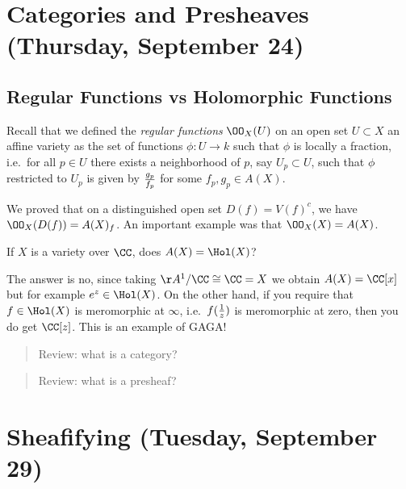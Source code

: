 \hypertarget{categories-and-presheaves-thursday-september-24}{%
\section{Categories and Presheaves (Thursday, September
24)}\label{categories-and-presheaves-thursday-september-24}}

\hypertarget{regular-functions-vs-holomorphic-functions}{%
\subsection{Regular Functions vs Holomorphic
Functions}\label{regular-functions-vs-holomorphic-functions}}

Recall that we defined the \emph{regular functions} \(\OO_X(U)\) on an
open set \(U\subset X\) an affine variety as the set of functions
\(\phi: U\to k\) such that \(\phi\) is locally a fraction, i.e.~for all
\(p\in U\) there exists a neighborhood of \(p\), say \(U_p \subset U\),
such that \(\phi\) restricted to \(U_p\) is given by \(g_p \over f_p\)
for some \(f_p, g_p \in A(X)\).

We proved that on a distinguished open set \(D(f) = V(f)^c\), we have
\(\OO_X(D(f)) = A(X)_f\). An important example was that
\(\OO_X(X) = A(X)\).

\begin{question}

If \(X\) is a variety over \(\CC\), does \(A(X) = \Hol(X)\)?

\end{question}

\begin{answer}

The answer is no, since taking \(\AA^1/\CC \cong \CC = X\) we obtain
\(A(X) = \CC[x]\) but for example \(e^z \in \Hol(X)\). On the other
hand, if you require that \(f\in \Hol(X)\) is meromorphic at \(\infty\),
i.e.~\(f({1\over z})\) is meromorphic at zero, then you do get
\(\CC[z]\). This is an example of GAGA!

\end{answer}

\begin{quote}
Review: what is a category?
\end{quote}

\begin{quote}
Review: what is a presheaf?
\end{quote}

\hypertarget{sheafifying-tuesday-september-29}{%
\section{Sheafifying (Tuesday, September
29)}\label{sheafifying-tuesday-september-29}}

